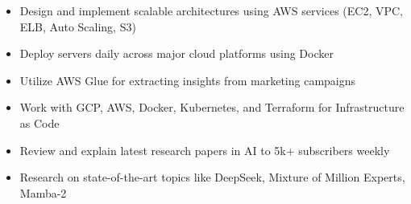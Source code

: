 \documentclass[10pt,a4paper,ragged2e]{altacv}
\begin{document}

\begin{fullwidth}
\makecvheader
\end{fullwidth}



\begin{itemize}
	\item Design and implement scalable architectures using AWS services (EC2, VPC, ELB, Auto Scaling, S3)
	\item Deploy servers daily across major cloud platforms using Docker
	\item Utilize AWS Glue for extracting insights from marketing campaigns
	\item Work with GCP, AWS, Docker, Kubernetes, and Terraform for Infrastructure as Code
\end{itemize}

\divider

\begin{itemize}
	\item Review and explain latest research papers in AI to 5k+ subscribers weekly
	\item Research on state-of-the-art topics like DeepSeek, Mixture of Million Experts, Mamba-2
\end{itemize}
\end{document}
